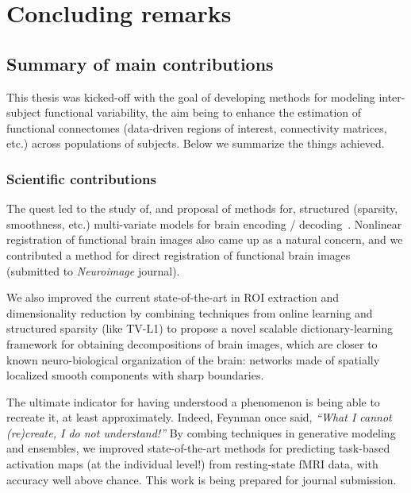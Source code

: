 \chapter{\;\;Concluding remarks}\label{chap:conclusion}

\minitoc

\section{Summary of main contributions}
This thesis was kicked-off with the goal of developing methods for modeling inter-subject
functional variability, the aim being to enhance the estimation of functional connectomes
(data-driven regions of interest, connectivity matrices, etc.)
across populations of subjects. Below we summarize the things achieved.

\subsection{Scientific contributions}
The quest led to the study of, and proposal of methods for, structured (sparsity, smoothness, etc.) multi-variate models for brain encoding / decoding~\citep{dohmatob2015speeding,abrahamregion,eickenberg2015total,pelle2016multivariate}. Nonlinear registration of functional brain images also came up as a natural concern, and we contributed a method for direct registration of functional brain images~\citep{dohmatob2016epi2epi} (submitted to \textit{Neuroimage} journal).

We also improved the current state-of-the-art in ROI extraction and dimensionality reduction by combining techniques from online learning and structured sparsity (like TV-L1) to propose a novel scalable dictionary-learning framework for obtaining decompositions of brain images, which are closer to known neuro-biological organization of the brain: networks made of spatially localized smooth components with sharp boundaries.

The ultimate indicator for having understood a phenomenon is being able to recreate it, at least approximately. Indeed, Feynman once said, \textit{``What I cannot (re)create, I do not understand!''} By combing techniques in generative modeling and ensembles, we improved state-of-the-art methods for predicting task-based activation maps (at the individual level!) from resting-state fMRI data, with accuracy well above chance.
This work is being prepared for journal submission.


